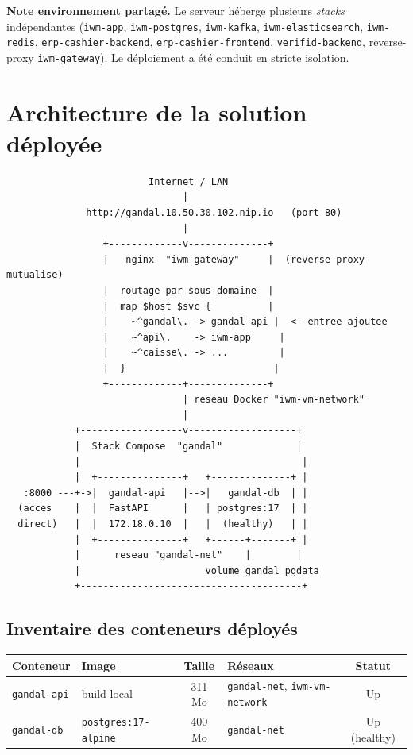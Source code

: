 \documentclass[11pt,a4paper]{article}
\newcommand{\code}[1]{\texttt{\small #1}}
\begin{document}
\medskip
\noindent\textbf{Note environnement partagé.} Le serveur héberge plusieurs \emph{stacks}
indépendantes (\code{iwm-app}, \code{iwm-postgres}, \code{iwm-kafka},
\code{iwm-elasticsearch}, \code{iwm-redis}, \code{erp-cashier-backend},
\code{erp-cashier-frontend}, \code{verifid-backend}, reverse-proxy \code{iwm-gateway}).
Le déploiement a été conduit en stricte isolation.

\newpage{}
\section{Architecture de la solution déployée}

\begin{lstlisting}
                         Internet / LAN
                               |
              http://gandal.10.50.30.102.nip.io   (port 80)
                               |
                 +-------------v--------------+
                 |   nginx  "iwm-gateway"     |  (reverse-proxy mutualise)
                 |  routage par sous-domaine  |
                 |  map $host $svc {          |
                 |    ~^gandal\. -> gandal-api |  <- entree ajoutee
                 |    ~^api\.    -> iwm-app     |
                 |    ~^caisse\. -> ...         |
                 |  }                          |
                 +-------------+--------------+
                               | reseau Docker "iwm-vm-network"
                               |
            +------------------v-------------------+
            |  Stack Compose  "gandal"             |
            |                                       |
            |  +---------------+   +--------------+ |
   :8000 ---+->|  gandal-api   |-->|   gandal-db  | |
  (acces    |  |  FastAPI      |   | postgres:17  | |
  direct)   |  |  172.18.0.10  |   |  (healthy)   | |
            |  +---------------+   +------+-------+ |
            |      reseau "gandal-net"    |        |
            |                      volume gandal_pgdata
            +---------------------------------------+
\end{lstlisting}

\subsection*{Inventaire des conteneurs déployés}

\begin{tabularx}{\linewidth}{@{}l l c X c@{}}
\toprule
\textbf{Conteneur} & \textbf{Image} & \textbf{Taille} & \textbf{Réseaux} & \textbf{Statut} \\
\midrule
\code{gandal-api} & build local & 311 Mo & \code{gandal-net}, \code{iwm-vm-network} & Up \\
\code{gandal-db} & \code{postgres:17-alpine} & 400 Mo & \code{gandal-net} & Up (healthy) \\
\bottomrule
\end{tabularx}
\end{document}
